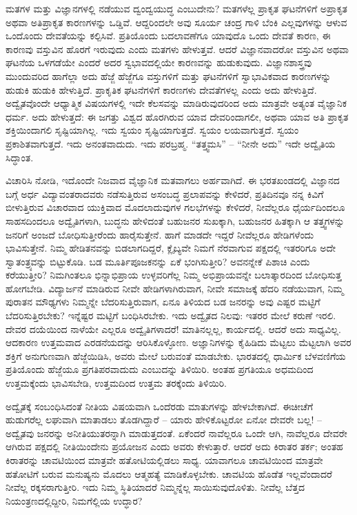 ಮತಗಳ ಮತ್ತು ವಿಜ್ಞಾನಗಳಲ್ಲಿ ನಡೆಯುವ ದ್ವಂದ್ವಯುದ್ಧ ಎಂಬುದೇನು? ಮತಗಳೆಲ್ಲ ಪ್ರಾಕೃತ ಘಟನೆಗಳಿಗೆ ಅಪ್ರಾಕೃತ ಅಥವಾ ಅತಿಪ್ರಾಕೃತ ಕಾರಣಗಳನ್ನು ಒಡ್ಡಿವೆ. ಆದ್ದರಿಂದಲೇ ಅವು ಸೂರ್ಯ ಚಂದ್ರ ಗಾಳಿ ಬೆಂಕಿ ಎಲ್ಲವುಗಳನ್ನು ಆಳುವ ಒಂದೊಂದು ದೇವತೆಯನ್ನು ಕಲ್ಪಿಸಿವೆ. ಪ್ರತಿಯೊಂದು ಬದಲಾವಣೆಗೂ ಯಾವುದೊ ಒಂದು ದೇವತೆ ಕಾರಣ, ಈ ಕಾರಣವು ವಸ್ತುವಿನ ಹೊರಗೆ ಇರುವುದು ಎಂದು ಮತಗಳು ಹೇಳುತ್ತವೆ. ಆದರೆ ವಿಜ್ಞಾನವಾದರೋ ವಸ್ತುವಿನ ಅಥವಾ ಘಟನೆಯ ಒಳಗಡೆಯೇ ಎಂದರೆ ಅದರ ಸ್ವಭಾವದಲ್ಲಿಯೇ ಕಾರಣವನ್ನು ಹುಡುಕುವುದು. ವಿಜ್ಞಾನಶಾಸ್ತ್ರವು ಮುಂದುವರಿದ ಹಾಗೆಲ್ಲಾ ಅದು ಹೆಜ್ಜೆ ಹೆಜ್ಜೆಗೂ ವಸ್ತುಗಳಿಗೆ ಮತ್ತು ಘಟನೆಗಳಿಗೆ ಸ್ವಾಭಾವಿಕವಾದ ಕಾರಣಗಳನ್ನು ಹುಡುಕಿ ಹುಡುಕಿ ಹೇಳುತ್ತಿದೆ. ಪ್ರಾಕೃತಿಕ ಘಟನೆಗಳಿಗೆ ಕಾರಣಗಳು ದೇವತೆಗಳಲ್ಲ ಎಂದು ಅದು ಹೇಳುತ್ತಿದೆ. ಅದ್ವೈತವೊಂದೇ ಆಧ್ಯಾತ್ಮಿಕ ವಿಷಯಗಳಲ್ಲಿ ಇದೇ ಕೆಲಸವನ್ನು ಮಾಡಿರುವುದರಿಂದ ಅದು ಮಾತ್ರವೇ ಅತ್ಯಂತ ವೈಜ್ಞಾನಿಕ ಧರ್ಮ. ಅದು ಹೇಳುತ್ತದೆ: ಈ ಜಗತ್ತು ವಿಶ್ವದ ಹೊರಗಿರುವ ಯಾವ ದೇವರಿಂದಾಗಲೀ, ಅಥವಾ ಯಾವ ಅತಿ ಪ್ರಾಕೃತ ಶಕ್ತಿಯಿಂದಾಗಲಿ ಸೃಷ್ಟಿಯಾಗಿಲ್ಲ. ಇದು ಸ್ವಯಂ ಸೃಷ್ಟಿಯಾಗುತ್ತದೆ. ಸ್ವಯಂ ಲಯವಾಗುತ್ತದೆ. ಸ್ವಯಂ ಪ್ರಕಾಶಿತವಾಗುತ್ತದೆ. ಇದು ಅನಂತವಾದುದು. ಇದು ಪರಬ್ರಹ್ಮ. “ತತ್ತ್ವಮಸಿ” – “ನೀನೇ ಅದು” ಇದೇ ಅದ್ವೈತಿಯ ಸಿದ್ಧಾಂತ.

ವಿಚಾರಿಸಿ ನೋಡಿ, ಇದೊಂದೇ ನಿಜವಾದ ವೈಜ್ಞಾನಿಕ ಮತವಾಗಲು ಅರ್ಹವಾಗಿದೆ. ಈ ಭರತಖಂಡದಲ್ಲಿ ವಿಜ್ಞಾನದ ಬಗ್ಗೆ ಅರ್ಧ ವಿದ್ಯಾವಂತರಾದವರು ನಡೆಸುತ್ತಿರುವ ಅಸಂಬದ್ಧ ಪ್ರಲಾಪವನ್ನು ಕೇಳಿದರೆ, ಪ್ರತಿದಿನವೂ ನನ್ನ ಕಿವಿಗೆ ಬೀಳುತ್ತಿರುವ ವಿಚಾರವಾದ ಯುಕ್ತಿವಾದ ಮೊದಲಾದುವುಗಳ ಗಲಭೆಗಳನ್ನು ಕೇಳಿದರೆ, ನೀವೆಲ್ಲರೂ ಧೈರ್ಯದಿಂದಲೂ ಸಾಹಸದಿಂದಲೂ ಅದ್ವೈತಿಗಳಾಗಿ, ಬುದ್ಧನು ಹೇಳಿದಂತೆ ಬಹುಜನರ ಸುಖಕ್ಕಾಗಿ, ಬಹುಜನರ ಹಿತಕ್ಕಾಗಿ ಆ ತತ್ತ್ವಗಳನ್ನು ಜನರಿಗೆ ಅಂಜದೆ ಬೋಧಿಸುತ್ತೀರೆಂದು ಹಾರೈಸುತ್ತೇನೆ. ಹಾಗೆ ಮಾಡದೇ ಇದ್ದರೆ ನೀವೆಲ್ಲರೂ ಹೇಡಿಗಳೆಂದು ಭಾವಿಸುತ್ತೇನೆ. ನಿಮ್ಮ ಹೇಡಿತನವನ್ನು ಬಿಡಲಾಗದಿದ್ದರೆ, ಕ್ಲೈಬ್ಯವೇ ನಿಮಗೆ ನೆರವಾಗುವ ಪಕ್ಷದಲ್ಲಿ ಇತರರಿಗೂ ಅದೇ ಸ್ವಾತಂತ್ರ್ಯವನ್ನು ಬಿಟ್ಟುಕೊಡಿ. ಬಡ ಮೂರ್ತಿಪೂಜಕನನ್ನು ಏಕೆ ಭಂಗಿಸುತ್ತೀರಿ? ಅವನನ್ನೇಕೆ ಪಿಶಾಚಿ ಎಂದು ಕರೆಯುತ್ತೀರಿ? ನಿಮಗಿಂತಲೂ ಭಿನ್ನಾಭಿಪ್ರಾಯ ಉಳ್ಳವರಿಗೆಲ್ಲ ನಿಮ್ಮ ಅಭಿಪ್ರಾಯವನ್ನೇ ಬಲಾತ್ಕಾರದಿಂದ ಬೋಧಿಸುತ್ತ ಹೋಗಬೇಡಿ. ವಿದ್ಯಾರ್ಜನೆ ಮಾಡಿರುವ ನೀವೇ ಹೇಡಿಗಳಾಗಿರುವಾಗ, ನೀವೇ ಸಮಾಜಕ್ಕೆ ಹೆದರಿ ನಡೆಯುವಾಗ, ನಿಮ್ಮ ಪುರಾತನ ಮೌಢ್ಯಗಳು ನಿಮ್ಮನ್ನೇ ಬೆದರಿಸುತ್ತಿರುವಾಗ, ಏನೂ ತಿಳಿಯದ ಬಡ ಜನರನ್ನು ಅವು ಎಷ್ಟರ ಮಟ್ಟಿಗೆ ಬೆದರಿಸುತ್ತಿರಬೇಕು? ಇನ್ನೆಷ್ಟರ ಮಟ್ಟಿಗೆ ಬಂಧಿಸಿರಬೇಕು. ಇದು ಅದ್ವೈತದ ನಿಲವು: ಇತರರ ಮೇಲೆ ಕರುಣೆ ಇರಲಿ. ದೇವರ ದಯೆಯಿಂದ ನಾಳೆಯೇ ಎಲ್ಲರೂ ಅದ್ವೈತಿಗಳಾದರೆ! ಮಾತಿನಲ್ಲಲ್ಲ, ಕಾರ್ಯದಲ್ಲಿ. ಆದರೆ ಅದು ಸಾಧ್ಯವಿಲ್ಲ. ಆದಕಾರಣ ಉತ್ತಮವಾದ ಎರಡನೆಯದನ್ನು ಆರಿಸಿಕೊಳ್ಳೋಣ. ಅಜ್ಞಾನಿಗಳನ್ನು ಕೈಹಿಡಿದು ಮೆಟ್ಟಲು ಮೆಟ್ಟಲಾಗಿ ಅವರ ಶಕ್ತಿಗೆ ಅನುಗುಣವಾಗಿ ಹೆಜ್ಜೆಯಿಡಿಸಿ, ಅವರು ಮೇಲೆ ಬರುವಂತೆ ಮಾಡಬೇಕು. ಭಾರತದಲ್ಲಿ ಧಾರ್ಮಿಕ ಬೆಳವಣಿಗೆಯ ಪ್ರತಿಯೊಂದು ಹೆಜ್ಜೆಯೂ ಪ್ರಗತಿಪರವಾದುದು ಎಂಬುದನ್ನು ತಿಳಿಯಿರಿ. ಅಂತಹ ಪ್ರಗತಿಯೂ ಅಧಮದಿಂದ ಉತ್ತಮಕ್ಕೆಂದು ಭಾವಿಸಬೇಡಿ, ಉತ್ತಮದಿಂದ ಉತ್ತಮ ತರಕ್ಕೆಂದು ತಿಳಿಯಿರಿ.

ಅದ್ವೈತಕ್ಕೆ ಸಂಬಂಧಿಸಿದಂತೆ ನೀತಿಯ ವಿಷಯವಾಗಿ ಒಂದೆರಡು ಮಾತುಗಳನ್ನು ಹೇಳಬೇಕಾಗಿದೆ. ಈಚೀಚೆಗೆ ಹುಡುಗರೆಲ್ಲ ಲಘುವಾಗಿ ಮಾತಾಡಲು ತೊಡಗಿದ್ದಾರೆ – ಯಾರು ಹೇಳಿಕೊಟ್ಟರೋ ಏನೋ ದೇವರೇ ಬಲ್ಲ! – ಅದ್ವೈತವು ಜನರನ್ನು ಅನೀತಿಯುತರನ್ನಾಗಿ ಮಾಡುತ್ತದಂತೆ. ಏಕೆಂದರೆ ನಾವೆಲ್ಲರೂ ಒಂದೇ ಆಗಿ, ನಾವೆಲ್ಲರೂ ದೇವರೇ ಆಗಿರುವ ಪಕ್ಷದಲ್ಲಿ ನೀತಿಯಿಂದೇನು ಪ್ರಯೋಜನ ಎಂದು ಅವರು ಕೇಳುತ್ತಾರೆ. ಆದರೆ ಅದು ಕಿರಾತರ ತರ್ಕ; ಅಂತಹ ಕಿರಾತರನ್ನು ಚಾವಟಿಯಿಂದ ಮಾತ್ರವೇ ಹತೋಟಿಯಲ್ಲಿಡಲು ಸಾಧ್ಯ. ಯಾವಾಗಲೂ ಚಾವಟಿಯಿಂದ ಮಾತ್ರವೇ ಹತೋಟಿಗೆ ಬರುವ ಮನುಷ್ಯನು ಮೊದಲು ಆತ್ಮಹತ್ಯೆ ಮಾಡಿಕೊಳ್ಳಬೇಕು. ಚಾವಟಿಯ ಹೊಡೆತ ಇಲ್ಲವೆಂದಾದರೆ ನೀವೆಲ್ಲ ರಕ್ಕಸರಾಗುತ್ತೀರಿ. ಇದು ನಿಮ್ಮ ಸ್ಥಿತಿಯಾದರೆ ನಿಮ್ಮನ್ನೆಲ್ಲ ಸಾಯಿಸುವುದೊಳಿತು. ನೀವೆಲ್ಲ ಬೆತ್ತದ ನಿಯಂತ್ರಣದಲ್ಲಿದ್ದೀರಿ, ನಿಮಗೆಲ್ಲಿಯ ಉದ್ಧಾರ?

